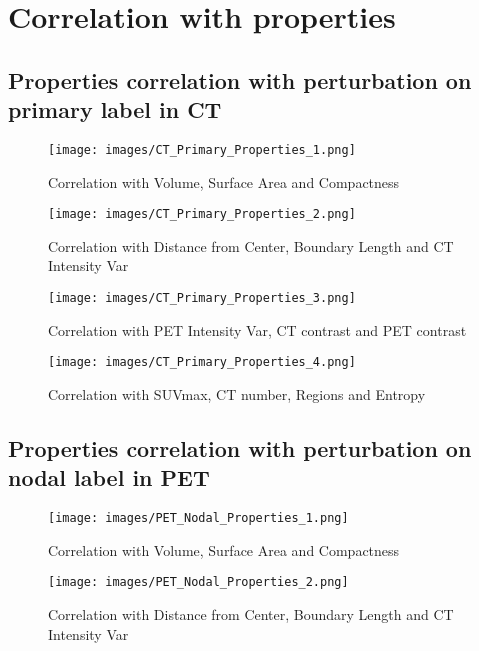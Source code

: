 
\chapter{Correlation with properties}

\label{chap:CorrProp}

\section{Properties correlation with perturbation on primary label in CT}
\begin{figure}[ht]
    \centering
    \texttt{[image: images/CT\_Primary\_Properties\_1.png]}
    \caption{Correlation with Volume, Surface Area and Compactness}
\end{figure}
\begin{figure}[ht]
    \centering
    \texttt{[image: images/CT\_Primary\_Properties\_2.png]}
    \caption{Correlation with Distance from Center, Boundary Length and CT Intensity Var}
\end{figure}
\begin{figure}[ht]
    \centering
    \texttt{[image: images/CT\_Primary\_Properties\_3.png]}
    \caption{Correlation with PET Intensity Var, CT contrast and PET contrast}
\end{figure}
\begin{figure}[ht]
    \centering
    \texttt{[image: images/CT\_Primary\_Properties\_4.png]}
    \caption{Correlation with SUVmax, CT number, Regions and Entropy}
\end{figure}

\clearpage
\section{Properties correlation with perturbation on nodal label in PET}

\begin{figure}[ht]
    \centering
    \texttt{[image: images/PET\_Nodal\_Properties\_1.png]}
    \caption{Correlation with Volume, Surface Area and Compactness}
\end{figure}

\begin{figure}[ht]
    \centering
    \texttt{[image: images/PET\_Nodal\_Properties\_2.png]}
    \caption{Correlation with Distance from Center, Boundary Length and CT Intensity Var}
\end{figure}

